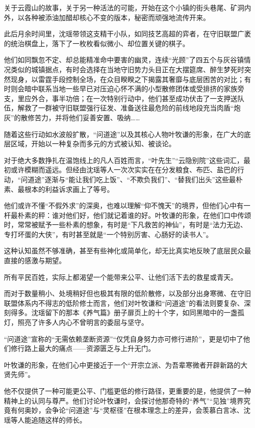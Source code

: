 关于云霞山的故事，关于另一种活法的可能，开始在这个小镇的街头巷尾、矿洞内外，以各种被添油加醋却核心不变的版本，秘密而顽强地流传开来。

此后月余时间里，沈瑶带领这支精干小队，如同技艺高超的弈者，在守旧联盟广袤的统治棋盘上，落下了一枚枚看似微小、却位置关键的棋子。

他们如同飘忽不定、却总能精准命中要害的幽灵，连续“光顾”了四五个与灰谷镇情况类似的城镇据点，有时会选择在当地守旧势力头目正在大摆筵席、醉生梦死时突然现身，以雷霆手段控制全场，在众目睽睽之下揭露其奢靡与底层困苦的对比；有时则会暗中联系当地一些早已对压迫心怀不满的小型散修团体或受排挤的家族旁支，里应外合，事半功倍；在一次特别行动中，他们甚至成功伏击了一支押送队伍，解救了一群被守旧联盟强行征发、准备送往最危险的前线地段充当肉盾“炮灰”的散修苦力，并将他们妥善安置、吸纳……

随着这些行动如水波般扩散，“问道途”以及其核心人物叶牧谦的形象，在广大的底层区域，开始以一种复杂而多元的方式被认知、被谈论。

对于绝大多数挣扎在温饱线上的凡人百姓而言，“叶先生”“云隐别院”这些词汇，最初或许模糊而遥远。但经由沈瑶等人一次次实实在在分发粮食、布匹、盐巴的行动，“问道途”逐渐与“能让我们吃上饭”、“不欺负我们”、“替我们出头”这些最朴素、最根本的利益诉求画上了等号。

他们或许不懂“不假外求”的深奥，也难以理解“仰不愧天”的境界，但他们心中有一杆最朴素的秤：谁对他们好，他们就记着谁的好。叶牧谦的形象，在他们口中传颂时，常常被赋予一些朴素的想象，有时是“下凡救苦的神仙”，有时是“法力无边、专打坏蛋的大侠”，有时甚至就是“一个特别厉害、心肠好的读书人”。

这种认知虽然不够准确，甚至有些神化或简单化，却无比真实地反映了底层民众最直接的感激与期望。

所有平民百姓，实际上都渴望一个能带来公平、让他们活下去的救星或青天。

而对于数量稍小、处境稍好但也极其有限的低阶散修，以及部分出身寒微、在守旧联盟体系内不得志的低阶修士而言，他们对叶牧谦和“问道途”的看法则要复杂、深刻得多。沈瑶留下的那本《养气篇》册子扉页上的十个字，如同黑暗中的一盏孤灯，照亮了许多人内心不曾明言的委屈与坚守。

“问道途”宣称的“无需依赖垄断资源”“仅凭自身努力亦可修行进阶”，更是切中了他们修行路上最大的痛点——资源匮乏与上升无门。

叶牧谦的形象，在他们心中更接近于一个“开宗立派、为吾辈寒微者开辟新路的大贤先师”。

他不仅提供了一种可能更公平、门槛更低的修行路径，更重要的是，他提供了一种精神上的认同与尊严。他们讨论叶牧谦时，会探讨他那奇特的“养气”“见独”境界究竟有何奥妙，会争论“问道途”与“灵枢径”在根本理念上的差异，会羡慕白言冰、沈瑶等人能追随这样的师长。

